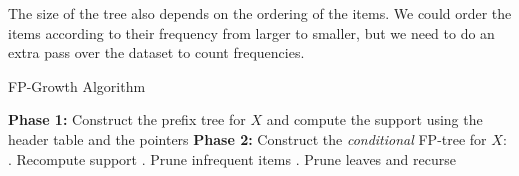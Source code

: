 The size of the tree also depends on the ordering of the items.
We could order the items according to their frequency from larger to smaller, but we need to do an extra pass over the dataset to count frequencies.

\begin{algorithm}
\caption{FP-Growth Algorithm}
\begin{algorithmic}[1]
    \State \textbf{Phase 1:} Construct the prefix tree for $X$ and compute the support using the header table and the pointers
        \State \textbf{Phase 2:} Construct the \textit{conditional} FP-tree for $X$:
        \State {}. Recompute support
        \State {}. Prune infrequent items
        \State {}. Prune leaves and recurse
    \EndIf
\EndFor
\end{algorithmic}
\end{algorithm}

